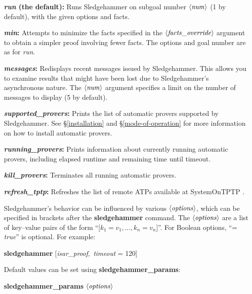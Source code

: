 \documentclass[a4paper,12pt]{article}
\def\qty#1{\ensuremath{\left<\mathit{#1\/}\right>}}
\begin{document}
\begin{enum}
\item[\labelitemi] \textbf{\textit{run} (the default):} Runs Sledgehammer on
subgoal number \qty{num} (1 by default), with the given options and facts.

\item[\labelitemi] \textbf{\textit{min}:} Attempts to minimize the facts
specified in the \qty{facts\_override} argument to obtain a simpler proof
involving fewer facts. The options and goal number are as for \textit{run}.

\item[\labelitemi] \textbf{\textit{messages}:} Redisplays recent messages issued
by Sledgehammer. This allows you to examine results that might have been lost
due to Sledgehammer's asynchronous nature. The \qty{num} argument specifies a
limit on the number of messages to display (5 by default).

\item[\labelitemi] \textbf{\textit{supported\_provers}:} Prints the list of
automatic provers supported by Sledgehammer. See \S\ref{installation} and
\S\ref{mode-of-operation} for more information on how to install automatic
provers.

\item[\labelitemi] \textbf{\textit{running\_provers}:} Prints information about
currently running automatic provers, including elapsed runtime and remaining
time until timeout.

\item[\labelitemi] \textbf{\textit{kill\_provers}:} Terminates all running
automatic provers.

\item[\labelitemi] \textbf{\textit{refresh\_tptp}:} Refreshes the list of remote
ATPs available at System\-On\-TPTP \cite{sutcliffe-2000}.
\end{enum}

Sledgehammer's behavior can be influenced by various \qty{options}, which can be
specified in brackets after the \textbf{sledgehammer} command. The
\qty{options} are a list of key--value pairs of the form ``[$k_1 = v_1,
\ldots, k_n = v_n$]''. For Boolean options, ``= \textit{true\/}'' is optional. For
example:

\prew
\textbf{sledgehammer} [\textit{isar\_proof}, \,\textit{timeout} = 120]
\postw

Default values can be set using \textbf{sledgehammer\_\allowbreak params}:

\prew
\textbf{sledgehammer\_params} \qty{options}
\postw
\end{document}
